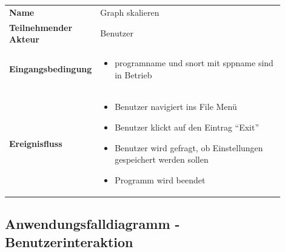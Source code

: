 \begin{tabular}{lp{0.9\linewidth}}
\textbf{Name} & Graph skalieren \\

\textbf{Teilnehmender Akteur} & Benutzer \\

\textbf{Eingangsbedingung} &
				\begin{minipage}[t]{\linewidth}
				\begin{itemize}[nosep,after=\strut,leftmargin=10pt]

				\item \gls{programname} und \gls{snort} mit \gls{sppname} sind in Betrieb

				\end{itemize}
				\end{minipage} \\
\textbf{Ereignisfluss} &
				\begin{minipage}[t]{\linewidth}
				\begin{itemize}[nosep,after=\strut,leftmargin=10pt]
				\item Benutzer navigiert ins File Menü
				\item Benutzer klickt auf den Eintrag ``Exit''
				\item Benutzer wird gefragt, ob Einstellungen gespeichert werden sollen
				\item Programm wird beendet
				\end{itemize}
				\end{minipage} \\
\end{tabular}

\pagebreak

\subsection*{Anwendungsfalldiagramm - Benutzerinteraktion}

